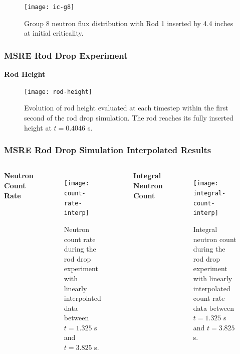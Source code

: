 \begin{frame}[noframenumbering]
  \begin{figure}[t]
    \centering
    \texttt{[image: ic-g8]}
    \caption{Group 8 neutron flux distribution with Rod 1 inserted by 4.4 inches at initial
    criticality.}
    \label{fig:ic-g8}
  \end{figure}
\end{frame}

\begin{frame}[noframenumbering]
  \frametitle{MSRE Rod Drop Experiment}
  \textbf{Rod Height}
  \begin{figure}[htb!]
    \centering
    \texttt{[image: rod-height]}
    \caption{Evolution of rod height evaluated at each timestep within the first second of the rod
    drop simulation. The rod reaches its fully inserted height at $t=0.4046$ s.}
    \label{fig:rod-height}
  \end{figure}
\end{frame}

\begin{frame}[noframenumbering]
  \frametitle{MSRE Rod Drop Simulation Interpolated Results}
  \begin{columns}
    \column{5.5cm}
    \centerline{\large \textbf{Neutron Count Rate}}
    \begin{figure}[t]
      \centering
      \texttt{[image: count-rate-interp]}
      \caption{Neutron count rate during the rod drop experiment with linearly
      interpolated data between $t=1.325$ s and $t=3.825$ s.}
      \label{fig:count-rate}
    \end{figure}
    \column{5.5cm}
    \centerline{\large \textbf{Integral Neutron Count}}
    \begin{figure}[t]
      \centering
      \texttt{[image: integral-count-interp]}
      \caption{Integral neutron count during the rod drop experiment with linearly interpolated
      count rate data between $t=1.325$ s and $t=3.825$ s.}
      \label{fig:count-rate}
    \end{figure}
  \end{columns}
\end{frame}

